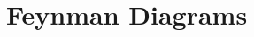 \documentclass[../classnotes.tex]{subfiles}
\begin{document}
\chapter{Feynman Diagrams}
\end{document}
